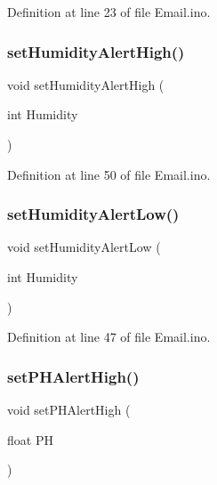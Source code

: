 Definition at line 23 of file Email.\+ino.

\mbox{\label{_email_8ino_a6b5262dce22c63572052abfd6090056f}} 
\subsubsection{\texorpdfstring{setHumidityAlertHigh()}{setHumidityAlertHigh()}}
{\footnotesize\ttfamily void set\+Humidity\+Alert\+High (\begin{DoxyParamCaption}\item[{int}]{Humidity }\end{DoxyParamCaption})}



Definition at line 50 of file Email.\+ino.

\mbox{\label{_email_8ino_a097db98fb141c337a9dec88986cb74a0}} 
\subsubsection{\texorpdfstring{setHumidityAlertLow()}{setHumidityAlertLow()}}
{\footnotesize\ttfamily void set\+Humidity\+Alert\+Low (\begin{DoxyParamCaption}\item[{int}]{Humidity }\end{DoxyParamCaption})}



Definition at line 47 of file Email.\+ino.

\mbox{\label{_email_8ino_a6d2a2a8fa9e9013d89f19c239d048a7a}} 
\subsubsection{\texorpdfstring{setPHAlertHigh()}{setPHAlertHigh()}}
{\footnotesize\ttfamily void set\+P\+H\+Alert\+High (\begin{DoxyParamCaption}\item[{float}]{PH }\end{DoxyParamCaption})}



